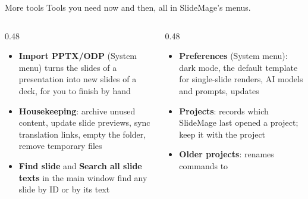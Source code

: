 
\begin{standardframe}{More tools}
	\small
	Tools you need now and then, all in SlideMage's menus.
	\par\medskip
	\begin{columns}[T,onlytextwidth]
		\begin{column}{0.48\linewidth}
			\begin{itemize}
				\item \textbf{Import PPTX/ODP} (System menu) turns the slides of a presentation into new slides of a deck, for you to finish by hand
				\item \textbf{Housekeeping}: archive unused content, update slide previews, sync translation links, empty the  folder, remove temporary files
				\item \textbf{Find slide} and \textbf{Search all slide texts} in the main window find any slide by ID or by its text
			\end{itemize}
		\end{column}
		\begin{column}{0.48\linewidth}
			\begin{itemize}
				\item \textbf{Preferences} (System menu): dark mode, the default template for single-slide renders, AI models and prompts, updates
				\item \textbf{Projects}:  records which SlideMage last opened a project; keep it with the project
				\item \textbf{Older projects}:  renames  commands to 
			\end{itemize}
		\end{column}
	\end{columns}
\end{standardframe}
